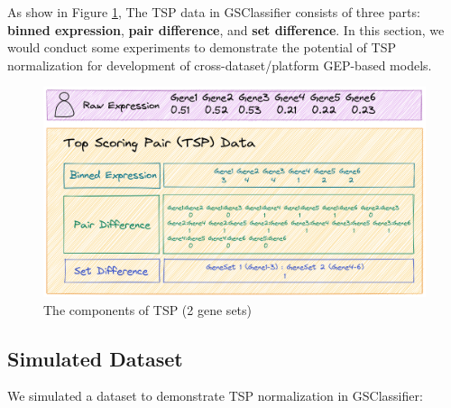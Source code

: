 \documentclass[
  12pt,
]{book}
\begin{document}
As show in Figure \ref{fig:tsp}, The TSP data in GSClassifier consists of three parts: \textbf{binned expression}, \textbf{pair difference}, and \textbf{set difference}. In this section, we would conduct some experiments to demonstrate the potential of TSP normalization for development of cross-dataset/platform GEP-based models.

\begin{figure}

{\centering \includegraphics[width=0.85\linewidth]{./fig/TSP} 

}

\caption{The components of TSP (2 gene sets)}\label{fig:tsp}
\end{figure}

\hypertarget{simulated-dataset}{%
\subsection{Simulated Dataset}\label{simulated-dataset}}

We simulated a dataset to demonstrate TSP normalization in GSClassifier:
\end{document}
